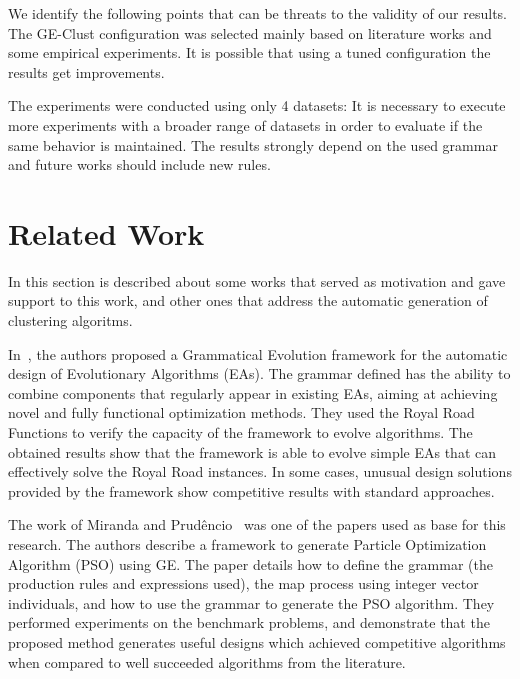 \documentclass[conference]{IEEEtran}
\begin{document}
	
	We identify the following points that can be threats to the validity of our results. The GE-Clust configuration was selected mainly based on literature works and some empirical experiments. It is possible that using a tuned configuration the results get improvements.
	
	The experiments were conducted using only 4 datasets: It is necessary to execute more experiments with a broader range of datasets in order to evaluate if the same behavior is maintained. The results strongly depend on the used grammar and future works should include new rules.
	
	
	
	\section{Related Work} \label{sec:related_work}
	
	In this section is described about some works that served as motivation and gave support to this work, and other ones that address the automatic generation of clustering algoritms.
	
	
	In~\cite{lourencco2012evolving,lourencco2015IEEE}, the authors proposed a Grammatical Evolution framework for the automatic design of Evolutionary Algorithms (EAs). The grammar defined has the ability to combine components that regularly appear in existing EAs, aiming at achieving novel and fully functional optimization methods. They used the Royal Road Functions to verify the capacity of the framework to evolve algorithms. The obtained results show that the framework is able to evolve simple EAs that can effectively solve the Royal Road instances. In some cases, unusual design solutions provided by the framework show competitive results with standard approaches.
	
	The work of Miranda and Prudêncio~\cite{miranda2015gefpso} was one of the papers used as base for this research. The authors describe a framework to generate Particle Optimization Algorithm (PSO) using GE. The paper details how to define the grammar (the production rules and expressions used), the map process using integer vector individuals, and how to use the grammar to generate the PSO algorithm. They performed experiments on the benchmark problems, and demonstrate that the proposed method generates useful designs which achieved competitive algorithms when compared to well succeeded algorithms from the literature.
	
\end{document}
